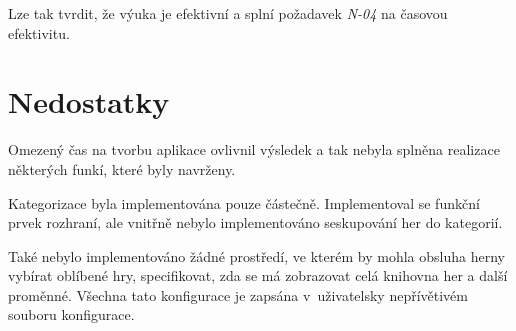 Lze tak tvrdit, že výuka je efektivní a splní požadavek \emph{N-04} na
časovou efektivitu.

\section{Nedostatky}\label{nedostatky}

Omezený čas na tvorbu aplikace ovlivnil výsledek a tak nebyla splněna realizace
některých funkí, které byly navrženy.

Kategorizace byla implementována pouze částečně. Implementoval se funkční
prvek rozhraní, ale vnitřně nebylo implementováno seskupování her do kategorií.

Také nebylo implementováno žádné prostředí, ve kterém by mohla obsluha herny
vybírat oblíbené hry, specifikovat, zda se má zobrazovat celá knihovna her
a další proměnné. Všechna tato konfigurace je zapsána
v~uživatelsky nepřívětivém souboru konfigurace.

